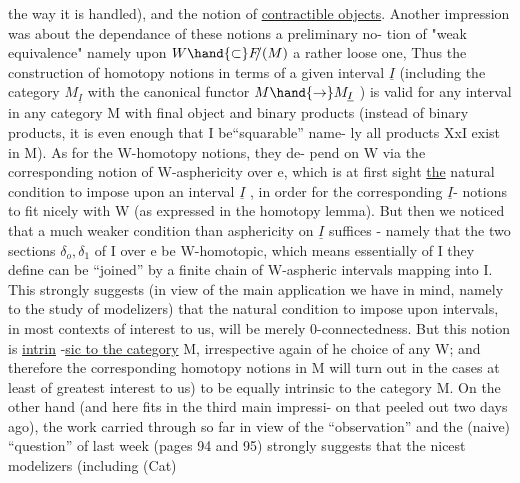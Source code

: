 the way it is handled),  and the notion of \uline{contractible objects}. Another
impression was about the dependance of these notions  a preliminary no-%
tion of "weak equivalence"  namely upon $W\hand{\subset} F\!\!/(M)$  a rather loose one,
Thus the construction of homotopy notions in terms of a given interval
$\underline{I}$ (including the category $M_{\underline{I}}$ with the canonical functor $M\hand{\to}M_{\underline{I}}$ ) is valid
for any interval in any category M with final object and binary products
(instead of binary products,  it is even enough that I be``squarable''\hand{,} name-%
ly all products XxI exist in M).  As for the W-homotopy notions,  they de-%
pend on W via the corresponding notion of W-asphericity over e,  which is
 at first sight \uline{the} natural condition to impose upon an interval $\underline{I}$ ,
in order for the corresponding $\underline{I}$- notions to fit nicely with W
(as expressed in the homotopy lemma).  But then we noticed that a much
weaker condition than asphericity on $\underline{I}$ suffices  -  namely that the two
sections $\delta_o,\delta_1$ of I over e be W-homotopic,  which means essentially  
 of I they define can be ``joined'' by a finite chain of
W-aspheric intervals mapping into I.  This strongly suggests (in view of
the main application we have in mind,  namely to the study of modelizers)
that the natural condition to impose upon intervals,  in most contexts of
interest to us,  will be merely 0-connectedness. But this notion is \uline{intrin}
-\uline{sic to the category} M,  irrespective again of he choice of any W;  and
therefore the corresponding homotopy notions in M will turn out in the
cases at least of greatest interest to us)  to be equally intrinsic to the
category M.   On the other hand (and here fits in the third main impressi-%
on that peeled out two days ago),  the work carried through so far in
view of the ``observation'' and the (naive) ``question'' of last week (pages
94 and 95) strongly suggests that  the nicest modelizers (including  (Cat)
